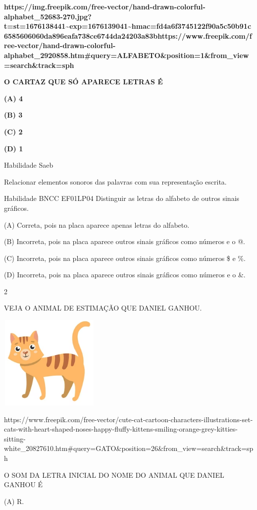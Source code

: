 \begin{escola}
\textbf{https://img.freepik.com/free-vector/hand-drawn-colorful-alphabet\_52683-270.jpg?t=st=1676138441\textasciitilde{}exp=1676139041\textasciitilde{}hmac=fd4a6f3745122f90a5c50b91c6585606060da896eafa738ce6744da24203a83bhttps://www.freepik.com/free-vector/hand-drawn-colorful-alphabet\_2920858.htm\#query=ALFABETO\&position=1\&from\_view=search\&track=sph}

\textbf{O CARTAZ QUE SÓ APARECE LETRAS É}

\textbf{(A) 4}

\textbf{(B) 3}

\textbf{(C) 2 }

\textbf{(D) 1}

Habilidade Saeb

Relacionar elementos sonoros das palavras com sua representação escrita.

Habilidade BNCC EF01LP04 Distinguir as letras do alfabeto de outros
sinais gráficos.

(A) Correta, pois na placa aparece apenas letras do alfabeto.

(B) Incorreta, pois na placa aparece outros sinais gráficos como números
e o @.

(C) Incorreta, pois na placa aparece outros sinais gráficos como números
\$ e \%.

(D) Incorreta, pois na placa aparece outros sinais gráficos como números
e o \&.

\num{2}

VEJA O ANIMAL DE ESTIMAÇÃO QUE DANIEL GANHOU.

\includegraphics[width=1.91250in,height=1.79167in]{media/image187.png}

https://www.freepik.com/free-vector/cute-cat-cartoon-characters-illustrations-set-cats-with-heart-shaped-noses-happy-fluffy-kittens-smiling-orange-grey-kitties-sitting-white\_20827610.htm\#query=GATO\&position=26\&from\_view=search\&track=sph

O SOM DA LETRA INICIAL DO NOME DO ANIMAL QUE DANIEL GANHOU É

(A) R.


\end{escola}
